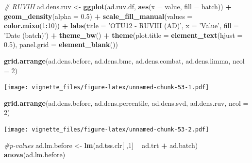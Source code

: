 \documentclass[]{book}
\newenvironment{Shaded}{\begin{snugshade}}{\end{snugshade}}
\newcommand{\KeywordTok}[1]{\textcolor[rgb]{0.13,0.29,0.53}{\textbf{#1}}}
\newcommand{\DataTypeTok}[1]{\textcolor[rgb]{0.13,0.29,0.53}{#1}}
\newcommand{\DecValTok}[1]{\textcolor[rgb]{0.00,0.00,0.81}{#1}}
\newcommand{\FloatTok}[1]{\textcolor[rgb]{0.00,0.00,0.81}{#1}}
\newcommand{\StringTok}[1]{\textcolor[rgb]{0.31,0.60,0.02}{#1}}
\newcommand{\CommentTok}[1]{\textcolor[rgb]{0.56,0.35,0.01}{\textit{#1}}}
\newcommand{\OperatorTok}[1]{\textcolor[rgb]{0.81,0.36,0.00}{\textbf{#1}}}
\newcommand{\NormalTok}[1]{#1}
\begin{document}
\begin{Shaded}
\begin{Highlighting}[]
\CommentTok{# RUVIII}
\NormalTok{ad.dens.ruv <-}\StringTok{ }\KeywordTok{ggplot}\NormalTok{(ad.ruv.df, }\KeywordTok{aes}\NormalTok{(}\DataTypeTok{x =}\NormalTok{ value, }\DataTypeTok{fill =}\NormalTok{ batch)) }\OperatorTok{+}\StringTok{ }
\StringTok{  }\KeywordTok{geom_density}\NormalTok{(}\DataTypeTok{alpha =} \FloatTok{0.5}\NormalTok{) }\OperatorTok{+}\StringTok{ }\KeywordTok{scale_fill_manual}\NormalTok{(}\DataTypeTok{values =} \KeywordTok{color.mixo}\NormalTok{(}\DecValTok{1}\OperatorTok{:}\DecValTok{10}\NormalTok{)) }\OperatorTok{+}\StringTok{ }
\StringTok{  }\KeywordTok{labs}\NormalTok{(}\DataTypeTok{title =} \StringTok{'OTU12 - RUVIII (AD)'}\NormalTok{, }\DataTypeTok{x =} \StringTok{'Value'}\NormalTok{, }\DataTypeTok{fill =} \StringTok{'Date (batch)'}\NormalTok{) }\OperatorTok{+}\StringTok{ }
\StringTok{  }\KeywordTok{theme_bw}\NormalTok{() }\OperatorTok{+}\StringTok{ }\KeywordTok{theme}\NormalTok{(}\DataTypeTok{plot.title =} \KeywordTok{element_text}\NormalTok{(}\DataTypeTok{hjust =} \FloatTok{0.5}\NormalTok{), }
                     \DataTypeTok{panel.grid =} \KeywordTok{element_blank}\NormalTok{())}
\end{Highlighting}
\end{Shaded}

\begin{Shaded}
\begin{Highlighting}[]
\KeywordTok{grid.arrange}\NormalTok{(ad.dens.before, ad.dens.bmc, }
\NormalTok{             ad.dens.combat, ad.dens.limma, }\DataTypeTok{ncol =} \DecValTok{2}\NormalTok{)}
\end{Highlighting}
\end{Shaded}

\texttt{[image: vignette\_files/figure-latex/unnamed-chunk-53-1.pdf]}

\begin{Shaded}
\begin{Highlighting}[]
\KeywordTok{grid.arrange}\NormalTok{(ad.dens.before, ad.dens.percentile, }
\NormalTok{             ad.dens.svd, ad.dens.ruv, }\DataTypeTok{ncol =} \DecValTok{2}\NormalTok{)}
\end{Highlighting}
\end{Shaded}

\texttt{[image: vignette\_files/figure-latex/unnamed-chunk-53-2.pdf]}

\begin{Shaded}
\begin{Highlighting}[]
\CommentTok{#p-values}
\NormalTok{ad.lm.before <-}\StringTok{ }\KeywordTok{lm}\NormalTok{(ad.tss.clr[ ,}\DecValTok{1}\NormalTok{] }\OperatorTok{~}\StringTok{ }\NormalTok{ad.trt }\OperatorTok{+}\StringTok{ }\NormalTok{ad.batch)}
\KeywordTok{anova}\NormalTok{(ad.lm.before)}
\end{Highlighting}
\end{Shaded}
\end{document}
